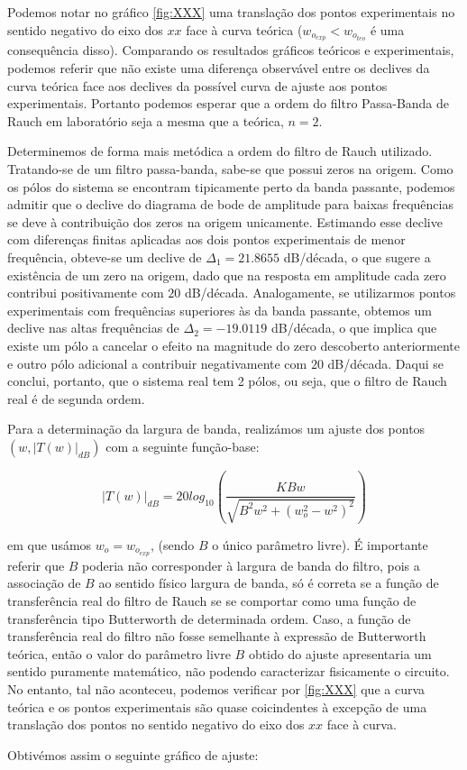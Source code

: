 \documentclass[a4paper,11pt]{report}
\begin{document}
Podemos notar no gráfico \ref{fig:XXX} uma translação dos pontos experimentais no sentido negativo do eixo dos $xx$ face à curva teórica ($w_{o_{exp}}<w_{o_{teo}}$ é uma consequência disso). Comparando os resultados gráficos teóricos e experimentais, podemos referir que não existe uma diferença observável entre os declives da curva teórica face aos declives da possível curva de ajuste aos pontos experimentais. Portanto podemos esperar que a ordem do filtro Passa-Banda de Rauch em laboratório seja a mesma que a teórica, $n=2$.   \\
\par
Determinemos de forma mais metódica a ordem do filtro de Rauch utilizado. Tratando-se de um filtro passa-banda, sabe-se que possui zeros na origem. Como os pólos do sistema se encontram tipicamente perto da banda passante, podemos admitir que o declive do diagrama de bode de amplitude para baixas frequências se deve à contribuição dos zeros na origem unicamente. Estimando esse declive com diferenças finitas aplicadas aos dois pontos experimentais de menor frequência, obteve-se um declive de $\Delta_1=21.8655$ dB/década, o que sugere a existência de um zero na origem, dado que na resposta em amplitude cada zero contribui positivamente com $20$ dB/década. Analogamente, se utilizarmos pontos experimentais com frequências superiores às da banda passante, obtemos um declive nas altas frequências de $\Delta_2=-19.0119$ dB/década, o que implica que existe um pólo a cancelar o efeito na magnitude do zero descoberto anteriormente e outro pólo adicional a contribuir negativamente com $20$ dB/década. Daqui se conclui, portanto, que o sistema real tem 2 pólos, ou seja, que o filtro de Rauch real é de segunda ordem. \\
\par
Para a determinação da largura de banda, realizámos um ajuste dos pontos $(w,|T(w)|_{dB})$ com a seguinte função-base:

$$|T(w)|_{dB}=20log_{10}\left(\frac{KBw}{\sqrt{B^2w^2+(w_o^2-w^2)^2}}\right)$$

em que usámos $w_o=w_{o_{exp}}$, (sendo $B$ o único parâmetro livre). É importante referir que $B$ poderia não corresponder à largura de banda do filtro, pois a associação de $B$ ao sentido físico largura de banda, só é correta se a função de transferência real do filtro de Rauch se se comportar como uma função de transferência tipo Butterworth de determinada ordem. Caso, a função de transferência real do filtro não fosse semelhante à expressão de Butterworth teórica, então o valor do parâmetro livre $B$ obtido do ajuste apresentaria um sentido puramente matemático, não podendo caracterizar fisicamente o circuito. No entanto, tal não aconteceu, podemos verificar por \ref{fig:XXX} que a curva teórica e os pontos experimentais são quase coicindentes à excepção de uma translação dos pontos no sentido negativo do eixo dos $xx$ face à curva.  \\
\par
Obtivémos assim o seguinte gráfico de ajuste:
\end{document}
